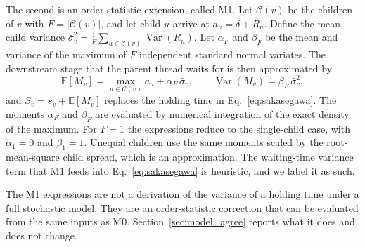 The second is an order-statistic extension, called M1. Let $\mathcal{C}(v)$ be the children of $v$ with $F=\lvert\mathcal{C}(v)\rvert$, and let child $u$ arrive at $a_u=\delta+R_u$. Define the mean child variance $\bar\sigma_v^2=\frac{1}{F}\sum_{u\in\mathcal{C}(v)}\operatorname{Var}(R_u)$. Let $\alpha_F$ and $\beta_F$ be the mean and variance of the maximum of $F$ independent standard normal variates. The downstream stage that the parent thread waits for is then approximated by
\begin{equation}
  \mathbb{E}[M_v]=\max_{u\in\mathcal{C}(v)} a_u+\alpha_F\,\bar\sigma_v,
  \qquad
  \operatorname{Var}(M_v)=\beta_F\,\bar\sigma_v^2,
  \label{eq:m1}
\end{equation}
and $S_v=s_v+\mathbb{E}[M_v]$ replaces the holding time in Eq.~\eqref{eq:sakasegawa}. The moments $\alpha_F$ and $\beta_F$ are evaluated by numerical integration of the exact density of the maximum. For $F=1$ the expressions reduce to the single-child case, with $\alpha_1=0$ and $\beta_1=1$. Unequal children use the same moments scaled by the root-mean-square child spread, which is an approximation. The waiting-time variance term that M1 feeds into Eq.~\eqref{eq:sakasegawa} is heuristic, and we label it as such.

The M1 expressions are not a derivation of the variance of a holding time under a full stochastic model. They are an order-statistic correction that can be evaluated from the same inputs as M0. Section~\ref{sec:model_agree} reports what it does and does not change.
